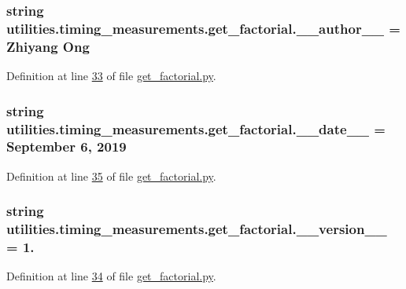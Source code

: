 \subsubsection[{\+\_\+\+\_\+author\+\_\+\+\_\+}]{\setlength{\rightskip}{0pt plus 5cm}string utilities.\+timing\+\_\+measurements.\+get\+\_\+factorial.\+\_\+\+\_\+author\+\_\+\+\_\+ = \textquotesingle{}Zhiyang Ong\textquotesingle{}}\label{namespaceutilities_1_1timing__measurements_1_1get__factorial_a043c91cb8f16c3570870212cabbde3c1}


Definition at line \hyperlink{get__factorial_8py_source_l00033}{33} of file \hyperlink{get__factorial_8py_source}{get\+\_\+factorial.\+py}.

\hypertarget{namespaceutilities_1_1timing__measurements_1_1get__factorial_a8b8b3f7bee60cdc7d63a3f6357047a30}{}
\subsubsection[{\+\_\+\+\_\+date\+\_\+\+\_\+}]{\setlength{\rightskip}{0pt plus 5cm}string utilities.\+timing\+\_\+measurements.\+get\+\_\+factorial.\+\_\+\+\_\+date\+\_\+\+\_\+ = \textquotesingle{}September 6, 2019\textquotesingle{}}\label{namespaceutilities_1_1timing__measurements_1_1get__factorial_a8b8b3f7bee60cdc7d63a3f6357047a30}


Definition at line \hyperlink{get__factorial_8py_source_l00035}{35} of file \hyperlink{get__factorial_8py_source}{get\+\_\+factorial.\+py}.

\hypertarget{namespaceutilities_1_1timing__measurements_1_1get__factorial_af4911964913b4a07e464413868da36f7}{}
\subsubsection[{\+\_\+\+\_\+version\+\_\+\+\_\+}]{\setlength{\rightskip}{0pt plus 5cm}string utilities.\+timing\+\_\+measurements.\+get\+\_\+factorial.\+\_\+\+\_\+version\+\_\+\+\_\+ = \textquotesingle{}1.\textquotesingle{}}\label{namespaceutilities_1_1timing__measurements_1_1get__factorial_af4911964913b4a07e464413868da36f7}


Definition at line \hyperlink{get__factorial_8py_source_l00034}{34} of file \hyperlink{get__factorial_8py_source}{get\+\_\+factorial.\+py}.

